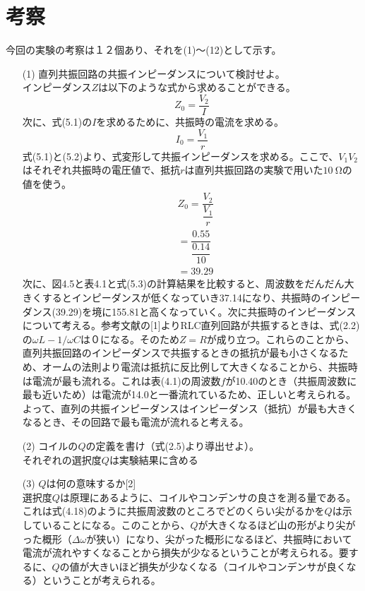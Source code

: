 \documentclass[12pt,a4paper]{jsarticle}
\numberwithin{equation}{section}
\numberwithin{figure}{section}
\numberwithin{table}{section}
\begin{document}
  \section{考察}
  今回の実験の考察は１２個あり、それを(1)～(12)として示す。
  \begin{itemize}
    \item [(1)]直列共振回路の共振インピーダンスについて検討せよ。\\
    インピーダンス$Z$は以下のような式から求めることができる。
    \begin{equation}
      Z_0=\dfrac{V_2}{I}
    \end{equation}
    次に、式(5.1)の$I$を求めるために、共振時の電流を求める。
    \begin{equation}
      I_0=\dfrac{V_1}{r}
    \end{equation}
    式(5.1)と(5.2)より、式変形して共振インピーダンスを求める。ここで、$V_1V_2$はそれぞれ共振時の電圧値で、抵抗$r$は直列共振回路の実験で用いた$\SI{10}{\ohm}$の値を使う。
    \begin{equation}
      \begin{split}
        &Z_0=\dfrac{V_2}{\dfrac{V_1}{r}}\\
        &=\dfrac{0.55}{\dfrac{0.14}{10}}\\
        &=39.29
      \end{split}
    \end{equation}
    次に、図4.5と表4.1と式(5.3)の計算結果を比較すると、周波数をだんだん大きくするとインピーダンスが低くなっていき37.14になり、共振時のインピーダンス(39.29)を境に155.81と高くなっていく。次に共振時のインピーダンスについて考える。参考文献の[1]よりRLC直列回路が共振するときは、式(2.2)の$\omega L-1/\omega C$は０になる。そのため$Z=R$が成り立つ。これらのことから、直列共振回路のインピーダンスで共振するときの抵抗が最も小さくなるため、オームの法則より電流は抵抗に反比例して大きくなることから、共振時は電流が最も流れる。これは表(4.1)の周波数$f$が10.40のとき（共振周波数に最も近いため）は電流が14.0と一番流れているため、正しいと考えられる。\\よって、直列の共振インピーダンスはインピーダンス（抵抗）が最も大きくなるとき、その回路で最も電流が流れると考える。
    \item [(2)]コイルの$Q$の定義を書け（式(2.5)より導出せよ）。\\それぞれの選択度$Q$は実験結果に含める
    \item [(3)]$Q$は何の意味するか[2]\\選択度$Q$は原理にあるように、コイルやコンデンサの良さを測る量である。これは式(4.18)のように共振周波数のところでどのくらい尖がるかを$Q$は示していることになる。このことから、$Q$が大きくなるほど山の形がより尖がった概形（$\Delta\omega$が狭い）になり、尖がった概形になるほど、共振時において電流が流れやすくなることから損失が少なるということが考えられる。要するに、$Q$の値が大きいほど損失が少なくなる（コイルやコンデンサが良くなる）ということが考えられる。

\end{itemize}
\end{document}
